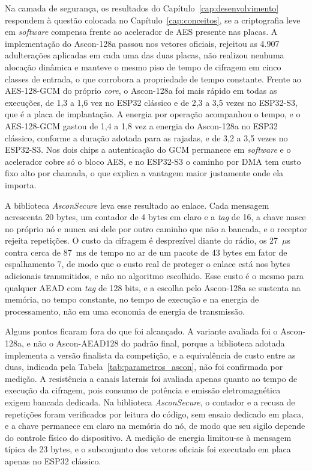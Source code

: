 Na camada de segurança, os resultados do Capítulo~\ref{cap:desenvolvimento} respondem à questão colocada no Capítulo~\ref{cap:conceitos}, se a criptografia leve em \textit{software} compensa frente ao acelerador de AES presente nas placas. A implementação do Ascon-128a passou nos vetores oficiais, rejeitou as 4.907 adulterações aplicadas em cada uma das duas placas, não realizou nenhuma alocação dinâmica e manteve o mesmo piso de tempo de cifragem em cinco classes de entrada, o que corrobora a propriedade de tempo constante. Frente ao AES-128-GCM do próprio \textit{core}, o Ascon-128a foi mais rápido em todas as execuções, de 1,3 a 1,6 vez no ESP32 clássico e de 2,3 a 3,5 vezes no ESP32-S3, que é a placa de implantação. A energia por operação acompanhou o tempo, e o AES-128-GCM gastou de 1,4 a 1,8 vez a energia do Ascon-128a no ESP32 clássico, conforme a duração adotada para as rajadas, e de 3,2 a 3,5 vezes no ESP32-S3. Nos dois chips a autenticação do GCM permanece em \textit{software} e o acelerador cobre só o bloco AES, e no ESP32-S3 o caminho por DMA tem custo fixo alto por chamada, o que explica a vantagem maior justamente onde ela importa.

A biblioteca \textit{AsconSecure} leva esse resultado ao enlace. Cada mensagem acrescenta 20 bytes, um contador de 4 bytes em claro e a \textit{tag} de 16, a chave nasce no próprio nó e nunca sai dele por outro caminho que não a bancada, e o receptor rejeita repetições. O custo da cifragem é desprezível diante do rádio, os 27~$\mu$s contra cerca de 87~ms de tempo no ar de um pacote de 43 bytes em fator de espalhamento 7, de modo que o custo real de proteger o enlace está nos bytes adicionais transmitidos, e não no algoritmo escolhido. Esse custo é o mesmo para qualquer AEAD com \textit{tag} de 128 bits, e a escolha pelo Ascon-128a se sustenta na memória, no tempo constante, no tempo de execução e na energia de processamento, não em uma economia de energia de transmissão.

Alguns pontos ficaram fora do que foi alcançado. A variante avaliada foi o Ascon-128a, e não o Ascon-AEAD128 do padrão final, porque a biblioteca adotada implementa a versão finalista da competição, e a equivalência de custo entre as duas, indicada pela Tabela~\ref{tab:parametros_ascon}, não foi confirmada por medição. A resistência a canais laterais foi avaliada apenas quanto ao tempo de execução da cifragem, pois consumo de potência e emissão eletromagnética exigem bancada dedicada. Na biblioteca \textit{AsconSecure}, o contador e a recusa de repetições foram verificados por leitura do código, sem ensaio dedicado em placa, e a chave permanece em claro na memória do nó, de modo que seu sigilo depende do controle físico do dispositivo. A medição de energia limitou-se à mensagem típica de 23 bytes, e o subconjunto dos vetores oficiais foi executado em placa apenas no ESP32 clássico.

